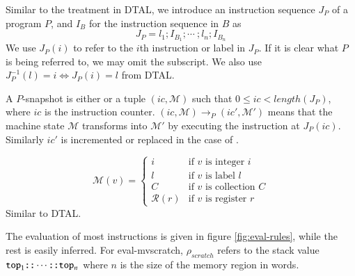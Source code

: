 
Similar to the treatment in DTAL, we introduce an instruction sequence $J_P$ of
a program $P$, and $I_B$ for the instruction sequence in $B$ as
\begin{equation*}
    J_P = {l_1; I_{B_1}; \cdots \ ; l_n; I_{B_n}}
\end{equation*}
We use $J_P(i)$ to refer to the $i$th instruction or label in $J_P$. If it is
clear what $P$ is being referred to, we may omit the subscript.
We also use $J_P^{-1}(l) = i \iff J_P(i) = l$ from DTAL.

A $P$-snapshot\cite{xi-dtal} is either \halt or a tuple $(ic, \mathcal M)$ such
that $0 \leq ic < length(J_P)$, where $ic$ is the instruction counter.
$(ic, \mathcal M) \rightarrow_P (ic', \mathcal M')$ means that the machine
state $\mathcal M$ transforms into $\mathcal M'$ by executing the instruction
at $J_P(ic)$. Similarly $ic'$ is incremented or replaced in the case of \jump.

\begin{equation*}
    \mathcal M(v) =
    \left\{
        \begin{array}{ll}
            i               & \text{if $v$ is integer $i$} \\
            l               & \text{if $v$ is label $l$} \\
            C               & \text{if $v$ is collection $C$} \\
            \mathcal R(r)   & \text{if $v$ is register $r$}
        \end{array}
    \right.
\end{equation*}
Similar to DTAL.

The evaluation of most instructions is given in figure \ref{fig:eval-rules},
while the rest is easily inferred. For eval-mvscratch, $\rho_{scratch}$ refers
to the stack value $\texttt{top}_1 \texttt{::} \cdots \texttt{::} \texttt{top}_n$ where $n$ is the size
of the memory region in words.

